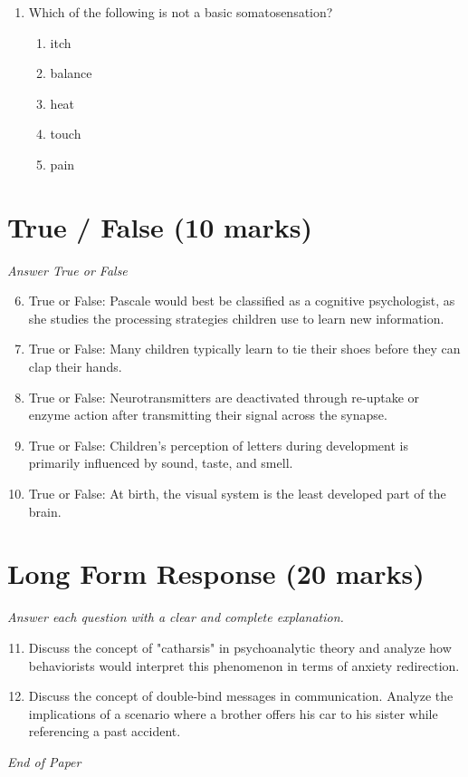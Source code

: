 \documentclass[12pt]{article}
\begin{document}
\begin{enumerate}[label=\arabic*.]
\begin{enumerate}[label=(\alph*)]
    \item more effective for minority clients
    \item only effective for nonminority clients
    \item more effective when client and therapist have different racial/ethnic origins
    \item equally effective
    \item only effective when client and therapist speak the same language
\end{enumerate}
\item Which of the following is not a basic somatosensation?
\begin{enumerate}[label=(\alph*)]
    \item itch
    \item balance
    \item heat
    \item touch
    \item pain
\end{enumerate}
\end{enumerate}

\section*{True / False (10 marks)}
\textit{Answer True or False}
\begin{enumerate}[label=\arabic*.]
\setcounter{enumi}{5}
\item True or False: Pascale would best be classified as a cognitive psychologist, as she studies the processing strategies children use to learn new information.
\item True or False: Many children typically learn to tie their shoes before they can clap their hands.
\item True or False: Neurotransmitters are deactivated through re-uptake or enzyme action after transmitting their signal across the synapse.
\item True or False: Children's perception of letters during development is primarily influenced by sound, taste, and smell.
\item True or False: At birth, the visual system is the least developed part of the brain.
\end{enumerate}

\section*{Long Form Response (20 marks)}
\textit{Answer each question with a clear and complete explanation.}
\begin{enumerate}[label=\arabic*.]
\setcounter{enumi}{10}
\item Discuss the concept of "catharsis" in psychoanalytic theory and analyze how behaviorists would interpret this phenomenon in terms of anxiety redirection.
\item Discuss the concept of double-bind messages in communication. Analyze the implications of a scenario where a brother offers his car to his sister while referencing a past accident.
\end{enumerate}

\vfill
\noindent\textit{End of Paper}
\end{document}
